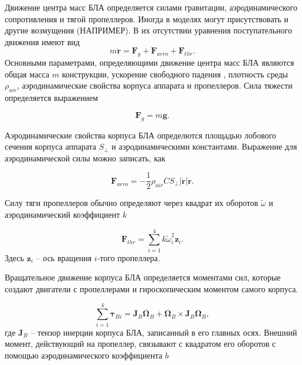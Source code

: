Движение центра масс БЛА определяется силами гравитации, аэродинамического сопротивления и тягой пропеллеров. Иногда в моделях могут присутствовать и другие возмущения (НАПРИМЕР). В их отсутствии уравнения поступательного движения имеют вид
\begin{equation} \label{eq:common_traslational_motion}
m \ddot{\bm{r}} = \bm{F}_g + \bm{F}_{aero} + \bm{F}_{thr}.
\end{equation}
Основными параметрами, определяющими движение центра масс БЛА являются общая масса {$m$} конструкции, ускорение свободного падения , плотность среды {$\rho_{air}$}, аэродинамические свойства корпуса аппарата и пропеллеров. Сила тяжести определяется выражением

\begin{equation} \label{eq:gravity_force}
\bm{F}_g = m\bm{g}.
\end{equation}

Аэродинамические свойства корпуса БЛА определются площадью лобового сечения корпуса аппарата {$S_{\perp}$} и аэродинамическими константами. Выражение для аэродинамической силы можно записать, как \cite{Biard01}

\begin{equation} \label{eq:aerodynamic_force}
\bm{F}_{aero} = - \frac{1}{2} \rho_{air} C S_{\perp} |\dot{\bm{r}}| \dot{\bm{r}}.
\end{equation}

Силу тяги пропеллеров обычно определяют через квадрат их оборотов $\tilde\omega$ и аэродинамический коэффициент $k$ \cite{Falconi01}

\begin{equation} \label{eq:thrust_force}
\bm{F}_{thr} = \sum_{i=1}^{4}{ { k \tilde\omega^2_i \bm{z}_i}.}
\end{equation}
Здесь $\bm{z}_i$ -- ось вращения $i$-того пропеллера.
 
Вращательное движение корпуса БЛА определяется моментами сил, которые создают двигатели с пропеллерами и гироскопическим моментом самого корпуса.

\begin{equation} \label{eq:common_rotational_motion}
\sum_{i=1}^{4}{\bm{\tau}_{Bi}} = \bm{J}_B\dot{\bm{\Omega}_B} + \bm{\Omega}_B \times  \bm{J}_B{\bm{\Omega}_B},
\end{equation}
где $\bm{J}_B$ -- тензор инерции корпуса БЛА, записанный в его главных осях.
Внешний момент, действующий на пропеллер, связывают с квадратом его оборотов с помощью аэродинамического коэффициента $b$ \cite{Ryll01}

